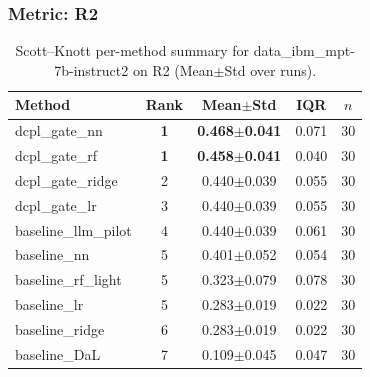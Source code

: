 \subsubsection*{Metric: R2}
\begin{table}[H]
\centering
\scriptsize
\setlength{\tabcolsep}{4pt}
\renewcommand{\arraystretch}{1.1}
\caption{Scott--Knott per-method summary for data\_ibm\_mpt-7b-instruct2 on R2 (Mean$\pm$Std over runs).}
\label{tab:sk_data_ibm_mpt-7b-instruct2_R2}
\begin{tabular}{l|c|c|c|c}
\hline
\textbf{Method} & \textbf{Rank} & \textbf{Mean$\pm$Std} & \textbf{IQR} & \textbf{$n$} \\
\hline
\rowcolor{red!15} dcpl\_gate\_nn & \textbf{1} & \textbf{0.468$\pm$0.041} & 0.071 & 30 \\
\rowcolor{red!15} dcpl\_gate\_rf & \textbf{1} & \textbf{0.458$\pm$0.041} & 0.040 & 30 \\
dcpl\_gate\_ridge & 2 & 0.440$\pm$0.039 & 0.055 & 30 \\
dcpl\_gate\_lr & 3 & 0.440$\pm$0.039 & 0.055 & 30 \\
baseline\_llm\_pilot & 4 & 0.440$\pm$0.039 & 0.061 & 30 \\
baseline\_nn & 5 & 0.401$\pm$0.052 & 0.054 & 30 \\
baseline\_rf\_light & 5 & 0.323$\pm$0.079 & 0.078 & 30 \\
baseline\_lr & 5 & 0.283$\pm$0.019 & 0.022 & 30 \\
baseline\_ridge & 6 & 0.283$\pm$0.019 & 0.022 & 30 \\
baseline\_DaL & 7 & 0.109$\pm$0.045 & 0.047 & 30 \\
\hline
\end{tabular}
\end{table}

